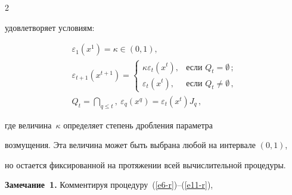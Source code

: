 \begin{multicols}{2}
  \vspace*{-4pt}


  


  \noindent


удовлетворяет условиям:





\vspace*{-4pt}





\noindent


\begin{multline}


\varepsilon_1\left(x^1\right) =\kappa\in (0,1),\\


\varepsilon_{t+1}\left(x^{t+1}\right) =\begin{cases}


\kappa \varepsilon_t(x^t), &\mbox{если } Q_t=\emptyset\,;\\


\varepsilon_t(x^t), &\mbox{если } Q_t\not= \emptyset\,,


\end{cases}\\


Q_t=\bigcap\limits_{q\leq t},\ \varepsilon_q(x^q)=\varepsilon_t(x^t)J_q\,,


\label{e11-r}


\end{multline}





\vspace*{-4pt}





\noindent


где величина~$\kappa$ определяет степень дробления параметра 


возмущения. Эта величина может быть выбрана любой на интервале $(0,1)$, 


но остается фиксированной на протяжении всей вычислительной процедуры.





\smallskip





\noindent


\textbf{Замечание~1.} Комментируя процедуру~(\ref{e6-r})--(\ref{e11-r}), 



\end{multicols}
